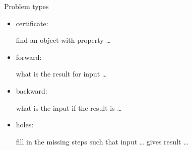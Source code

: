\begin{slide}{Problem types}

  \begin{itemize}
  \item certificate:
    
    find an object with property \dots

  \item forward: 

    what is the result for input \dots

  \item backward:

    what is the input if the result is \dots

  \item holes:

    fill in the missing steps such that input \dots
    gives result \dots

  \end{itemize}

\end{slide}
